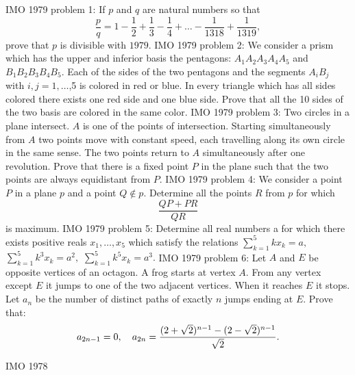 IMO 1979 problem 1:  If $p$ and $q$ are natural numbers so that
\[ \frac{p}{q}=1-\frac{1}{2}+\frac{1}{3}-\frac{1}{4}+ \ldots -\frac{1}{1318}+\frac{1}{1319}, \]
prove that $p$ is divisible with $1979$. 
IMO 1979 problem 2:  We consider a prism which has the upper and inferior basis the pentagons: $A_1A_2A_3A_4A_5$ and $B_1B_2B_3B_4B_5$. Each of the sides of the two pentagons and the segments $A_iB_j$ with $i,j=1,\ldots$,5 is colored in red or blue. In every triangle which has all sides colored there exists one red side and one blue side. Prove that all the 10 sides of the two basis are colored in the same color. 
IMO 1979 problem 3:  Two circles in a plane intersect. $A$ is one of the points of intersection. Starting simultaneously from $A$ two points move with constant speed, each travelling along its own circle in the same sense. The two points return to $A$ simultaneously after one revolution. Prove that there is a fixed point $P$ in the plane such that the two points are always equidistant from $P.$ 
IMO 1979 problem 4:  We consider a point $P$ in a plane $p$ and a point $Q \not\in p$. Determine all the points $R$ from $p$ for which
\[ \frac{QP+PR}{QR} \]
is maximum. 
IMO 1979 problem 5:  Determine all real numbers a for which there exists positive reals $x_1, \ldots, x_5$ which satisfy the relations $ \sum_{k=1}^5 kx_k=a,$ $ \sum_{k=1}^5 k^3x_k=a^2,$ $ \sum_{k=1}^5 k^5x_k=a^3.$ 
IMO 1979 problem 6:  Let $A$ and $E$ be opposite vertices of an octagon. A frog starts at vertex $A.$ From any vertex except $E$ it jumps to one of the two adjacent vertices. When it reaches $E$ it stops. Let $a_n$ be the number of distinct paths of exactly $n$ jumps ending at $E$. Prove that:
\[ a_{2n-1}=0, \quad a_{2n}={(2+\sqrt2)^{n-1} - (2-\sqrt2)^{n-1} \over\sqrt2}. \] 

IMO 1978 

